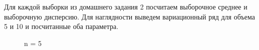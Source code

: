 \documentclass[a4paper,12pt, oneside]{book}
\begin{document}
Для каждой выборки из домашнего задания 2 посчитаем выборочное среднее и выборочную дисперсию. Для наглядности выведем вариационный ряд  для объема 5 и 10 и посчитанные оба параметра.

\begin{figure}[h!]
	\begin{center}
		\begin{minipage}[h]{0.47\linewidth}
			 n = 5 \\

\end{minipage}
\end{center}
\end{figure}
\end{document}
